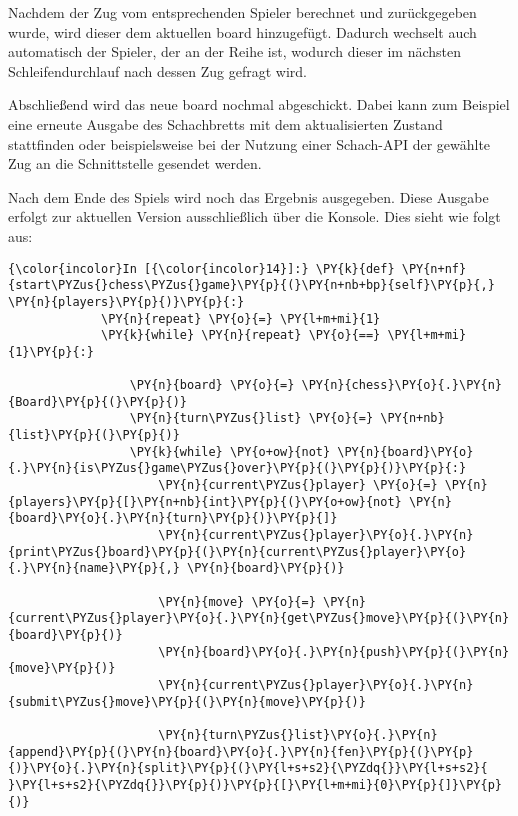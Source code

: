     Nachdem der Zug vom entsprechenden Spieler berechnet und zurückgegeben
wurde, wird dieser dem aktuellen board hinzugefügt. Dadurch wechselt
auch automatisch der Spieler, der an der Reihe ist, wodurch dieser im
nächsten Schleifendurchlauf nach dessen Zug gefragt wird.

Abschließend wird das neue board nochmal abgeschickt. Dabei kann zum
Beispiel eine erneute Ausgabe des Schachbretts mit dem aktualisierten
Zustand stattfinden oder beispielsweise bei der Nutzung einer Schach-API
der gewählte Zug an die Schnittstelle gesendet werden.

Nach dem Ende des Spiels wird noch das Ergebnis ausgegeben. Diese
Ausgabe erfolgt zur aktuellen Version ausschließlich über die Konsole.
Dies sieht wie folgt aus:

    \begin{Verbatim}[commandchars=\\\{\}]
{\color{incolor}In [{\color{incolor}14}]:} \PY{k}{def} \PY{n+nf}{start\PYZus{}chess\PYZus{}game}\PY{p}{(}\PY{n+nb+bp}{self}\PY{p}{,} \PY{n}{players}\PY{p}{)}\PY{p}{:}
             \PY{n}{repeat} \PY{o}{=} \PY{l+m+mi}{1}
             \PY{k}{while} \PY{n}{repeat} \PY{o}{==} \PY{l+m+mi}{1}\PY{p}{:}
         
                 \PY{n}{board} \PY{o}{=} \PY{n}{chess}\PY{o}{.}\PY{n}{Board}\PY{p}{(}\PY{p}{)}
                 \PY{n}{turn\PYZus{}list} \PY{o}{=} \PY{n+nb}{list}\PY{p}{(}\PY{p}{)}
                 \PY{k}{while} \PY{o+ow}{not} \PY{n}{board}\PY{o}{.}\PY{n}{is\PYZus{}game\PYZus{}over}\PY{p}{(}\PY{p}{)}\PY{p}{:}
                     \PY{n}{current\PYZus{}player} \PY{o}{=} \PY{n}{players}\PY{p}{[}\PY{n+nb}{int}\PY{p}{(}\PY{o+ow}{not} \PY{n}{board}\PY{o}{.}\PY{n}{turn}\PY{p}{)}\PY{p}{]}
                     \PY{n}{current\PYZus{}player}\PY{o}{.}\PY{n}{print\PYZus{}board}\PY{p}{(}\PY{n}{current\PYZus{}player}\PY{o}{.}\PY{n}{name}\PY{p}{,} \PY{n}{board}\PY{p}{)}
         
                     \PY{n}{move} \PY{o}{=} \PY{n}{current\PYZus{}player}\PY{o}{.}\PY{n}{get\PYZus{}move}\PY{p}{(}\PY{n}{board}\PY{p}{)}
                     \PY{n}{board}\PY{o}{.}\PY{n}{push}\PY{p}{(}\PY{n}{move}\PY{p}{)}
                     \PY{n}{current\PYZus{}player}\PY{o}{.}\PY{n}{submit\PYZus{}move}\PY{p}{(}\PY{n}{move}\PY{p}{)}
         
                     \PY{n}{turn\PYZus{}list}\PY{o}{.}\PY{n}{append}\PY{p}{(}\PY{n}{board}\PY{o}{.}\PY{n}{fen}\PY{p}{(}\PY{p}{)}\PY{o}{.}\PY{n}{split}\PY{p}{(}\PY{l+s+s2}{\PYZdq{}}\PY{l+s+s2}{ }\PY{l+s+s2}{\PYZdq{}}\PY{p}{)}\PY{p}{[}\PY{l+m+mi}{0}\PY{p}{]}\PY{p}{)}
         

\end{Verbatim}
